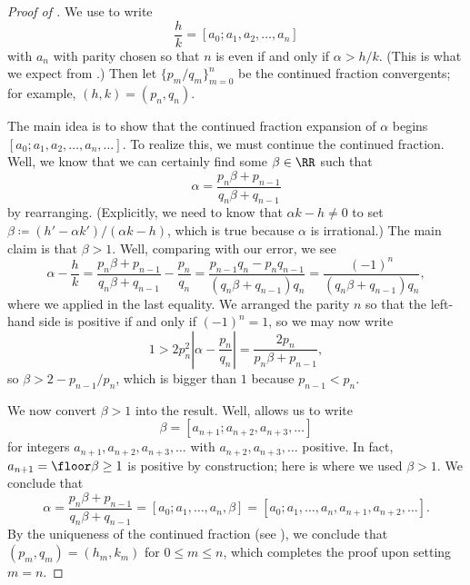\documentclass[../notes.tex]{subfiles}
\begin{document}
\begin{proof}[Proof of ]
	We use  to write
	\[\frac hk=[a_0;a_1,a_2,\ldots,a_n]\]
	with $a_n$ with parity chosen so that $n$ is even if and only if $\alpha>h/k$. (This is what we expect from .) Then let $\{p_m/q_m\}_{m=0}^n$ be the continued fraction convergents; for example, $(h,k)=(p_n,q_n)$.
	
	The main idea is to show that the continued fraction expansion of $\alpha$ begins $[a_0;a_1,a_2,\ldots,a_n,\ldots]$. To realize this, we must continue the continued fraction. Well, we know that we can certainly find some $\beta\in\RR$ such that
	\[\alpha=\frac{p_n\beta+p_{n-1}}{q_n\beta+q_{n-1}}\]
	by rearranging. (Explicitly, we need to know that $\alpha k-h\ne0$ to set $\beta\coloneqq(h'-\alpha k')/(\alpha k-h)$, which is true because $\alpha$ is irrational.) The main claim is that $\beta>1$. Well, comparing with our error, we see
	\[\alpha-\frac hk=\frac{p_n\beta+p_{n-1}}{q_n\beta+q_{n-1}}-\frac{p_n}{q_n}=\frac{p_{n-1}q_n-p_nq_{n-1}}{(q_n\beta+q_{n-1})q_n}=\frac{(-1)^n}{(q_n\beta+q_{n-1})q_n},\]
	where we applied  in the last equality. We arranged the parity $n$ so that the left-hand side is positive if and only if $(-1)^n=1$, so we may now write
	\[1>2p_n^2\left|\alpha-\frac{p_n}{q_n}\right|=\frac{2p_n}{p_n\beta+p_{n-1}},\]
	so $\beta>2-p_{n-1}/p_n$, which is bigger than $1$ because $p_{n-1}<p_n$.
	
	We now convert $\beta>1$ into the result. Well,  allows us to write
	\[\beta=[a_{n+1};a_{n+2},a_{n+3},\ldots]\]
	for integers $a_{n+1},a_{n+2},a_{n+3},\ldots$ with $a_{n+2},a_{n+3},\ldots$ positive. In fact, $a_{n+1}=\floor\beta\ge1$ is positive by construction; here is where we used $\beta>1$. We conclude that
	\[\alpha=\frac{p_n\beta+p_{n-1}}{q_n\beta+q_{n-1}}=[a_0;a_1,\ldots,a_n,\beta]=[a_0;a_1,\ldots,a_n,a_{n+1},a_{n+2},\ldots].\]
	By the uniqueness of the continued fraction (see ), we conclude that $(p_m,q_m)=(h_m,k_m)$ for $0\le m\le n$, which completes the proof upon setting $m=n$.
\end{proof}
\end{document}
